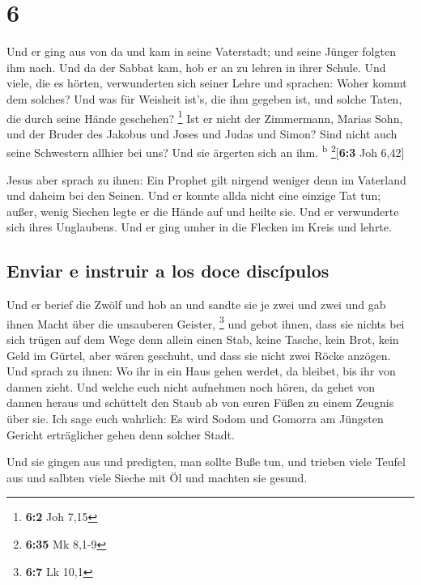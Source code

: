 \hypertarget{section-5}{%
\section{6}\label{section-5}}

 Und er ging aus von da und kam in seine Vaterstadt; und
seine Jünger folgten ihm nach.  Und da der Sabbat kam, hob
er an zu lehren in ihrer Schule. Und viele, die es hörten, verwunderten
sich seiner Lehre und sprachen: Woher kommt dem solches? Und was für
Weisheit ist's, die ihm gegeben ist, und solche Taten, die durch seine
Hände geschehen? \footnote{\textbf{6:2} Joh 7,15}  Ist er
nicht der Zimmermann, Marias Sohn, und der Bruder des Jakobus und Joses
und Judas und Simon? Sind nicht auch seine Schwestern allhier bei uns?
Und sie ärgerten sich an ihm. \textsuperscript{b}
\footnote{\textbf{6:35} Mk 8,1-9}{[}\textbf{6:3} Joh 6,42{]}

 Jesus aber sprach zu ihnen: Ein Prophet gilt nirgend
weniger denn im Vaterland und daheim bei den Seinen.  Und
er konnte allda nicht eine einzige Tat tun; außer, wenig Siechen legte
er die Hände auf und heilte sie.  Und er verwunderte sich
ihres Unglaubens. Und er ging umher in die Flecken im Kreis und lehrte.

\hypertarget{enviar-e-instruir-a-los-doce-discuxedpulos}{%
\subsection{Enviar e instruir a los doce
discípulos}\label{enviar-e-instruir-a-los-doce-discuxedpulos}}

 Und er berief die Zwölf und hob an und sandte sie je zwei
und zwei und gab ihnen Macht über die unsauberen Geister, \footnote{\textbf{6:7}
  Lk 10,1}  und gebot ihnen, dass sie nichts bei sich
trügen auf dem Wege denn allein einen Stab, keine Tasche, kein Brot,
kein Geld im Gürtel,  aber wären geschuht, und dass sie
nicht zwei Röcke anzögen.  Und sprach zu ihnen: Wo ihr in
ein Haus gehen werdet, da bleibet, bis ihr von dannen zieht.
 Und welche euch nicht aufnehmen noch hören, da gehet von
dannen heraus und schüttelt den Staub ab von euren Füßen zu einem
Zeugnis über sie. Ich sage euch wahrlich: Es wird Sodom und Gomorra am
Jüngsten Gericht erträglicher gehen denn solcher Stadt.

 Und sie gingen aus und predigten, man sollte Buße tun,
 und trieben viele Teufel aus und salbten viele Sieche
mit Öl und machten sie gesund.

